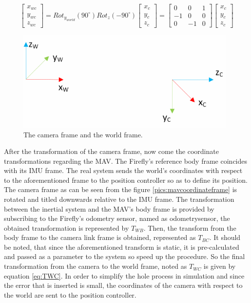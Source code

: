  \begin{equation}
 \label{eq:camtoworldrot}
 \left[\begin{array}{c}
 x_{wc} \\ y_{wc} \\ z_{wc}  \end{array} \right] = Rot_{y_{world}}(90^{\circ})Rot_z(-90^{\circ})\left[ \begin{array}{c} x_c \\ y_c \\z_c \end{array} \right] = \begin{bmatrix} 0 & 0 & 1 \\ -1 & 0 & 0 \\ 0 & -1 & 0 \end{bmatrix} \left[ \begin{array}{c} x_c \\ y_c \\z_c \end{array} \right]
 \end{equation}
  
  
 \begin{figure}
    \centering
    \includegraphics[width=0.98\textwidth]{images/world_camera_frame.pdf}
    \caption{The camera frame and the world frame.}
    \label{pics:worldcamframe}
 \end{figure}
 
 After the transformation of the camera frame, now come the coordinate transformations regarding the MAV. The Firefly's reference body frame coincides with its IMU frame. The real system sends the world's coordinates with respect to the aforementioned frame to the position controller so as to define its position. The camera frame as can be seen from the figure \ref{pics:mavcoordinateframe} is rotated and titled downwards relative to the IMU frame. The transformation between the inertial system and the MAV's body frame is provided by subscribing to the Firefly's odometry sensor, named as odometry\textunderscore sensor, the obtained transformation is represented by $T_{WB}$. Then, the transform from the body frame to the camera link frame is obtained, represented as $T_{BC}$. It should be noted, that since the aforementioned transform is static, it is pre-calculated and passed as a parameter to the system so speed up the procedure. So the final transformation from the camera to the world frame, noted as $T_{WC}$ is given by equation \ref{eq:TWC}. In order to simplify the hole process in simulation and since the error that is inserted is small, the coordinates of the camera with respect to the world are sent to the position controller.  
 
